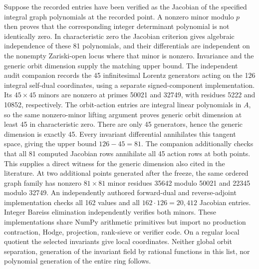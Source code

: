 \documentclass[11pt]{article}
\begin{document}
Suppose the recorded entries have been verified as the Jacobian of the
specified integral graph polynomials at the recorded point. A nonzero minor
modulo $p$ then proves that the corresponding integer determinant polynomial
is not identically zero. In characteristic zero the Jacobian criterion gives
algebraic independence of these 81 polynomials, and their differentials are
independent on the nonempty Zariski-open locus where that minor is nonzero.
Invariance and the generic orbit dimension supply the matching upper bound.
The independent audit companion
 records the 45 infinitesimal
Lorentz generators acting on the 126 integral self-dual coordinates, using a
separate signed-component implementation. Its $45\times45$ minors are nonzero
at primes 50021 and 32749, with residues 5222 and 10852, respectively. The
orbit-action entries are integral linear polynomials in $A$, so the same
nonzero-minor lifting argument proves generic orbit dimension at least 45 in
characteristic zero. There are only 45 generators, hence the generic dimension
is exactly 45. Every invariant differential annihilates this tangent space,
giving the upper bound $126-45=81$. The companion additionally checks that all
81 computed Jacobian rows annihilate all 45 action rows at both points. This
supplies a direct witness for the generic dimension also cited in the literature.
At two additional points generated after the freeze, the same ordered graph
family has nonzero $81\times81$ minor residues 35642 modulo 50021 and 22345
modulo 32749. An independently authored forward-dual and reverse-adjoint
implementation checks all 162 values and all $162\cdot126=20{,}412$ Jacobian
entries. Integer Bareiss elimination independently verifies both minors.
These implementations share NumPy arithmetic primitives but import no
production contraction, Hodge, projection, rank-sieve or verifier code.
On a regular local quotient the selected invariants give local coordinates.
Neither global orbit separation, generation of the invariant field by rational
functions in this list, nor polynomial generation of the entire ring follows.
\end{document}
